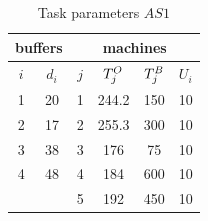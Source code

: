 \documentclass{ifacconf}
\begin{document}
\begin{table}[h!]
\centering
\small
\begin{tabular}{||c|c||c|c|c|c||}
\hline \multicolumn{2}{||c||}{buffers}&\multicolumn{4}{|c||}{machines}\\
\hline
$i$ & $d_i$ & $j$ & $T^{\rm O}_j$ & $T^{\rm B}_j$ & $U_i$\\
\hline
1 & 20 & 1 & 244.2 & 150 & 10\\
2 & 17 & 2 & 255.3 & 300 & 10\\
3 & 38 & 3 & 176 & 75 & 10\\
4 & 48 & 4 & 184 & 600 & 10\\
&& 5 & 192 & 450 & 10\\
\hline
\end{tabular}\\
\caption{Task parameters $\textit{AS1}$}\label{tabl:as1}
\end{table}
\end{document}
